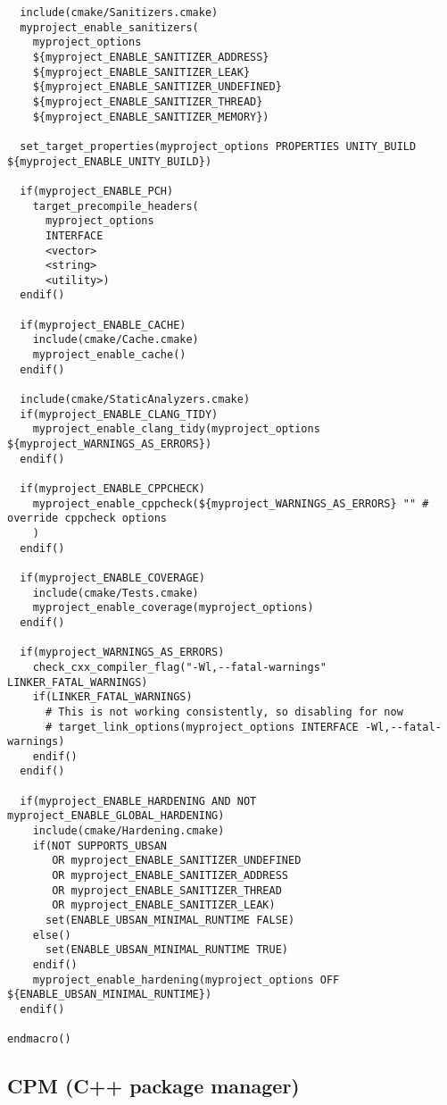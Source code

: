 \documentclass[openany]{report}
\begin{document}
\begin{verbatim}
  include(cmake/Sanitizers.cmake)
  myproject_enable_sanitizers(
    myproject_options
    ${myproject_ENABLE_SANITIZER_ADDRESS}
    ${myproject_ENABLE_SANITIZER_LEAK}
    ${myproject_ENABLE_SANITIZER_UNDEFINED}
    ${myproject_ENABLE_SANITIZER_THREAD}
    ${myproject_ENABLE_SANITIZER_MEMORY})

  set_target_properties(myproject_options PROPERTIES UNITY_BUILD ${myproject_ENABLE_UNITY_BUILD})

  if(myproject_ENABLE_PCH)
    target_precompile_headers(
      myproject_options
      INTERFACE
      <vector>
      <string>
      <utility>)
  endif()

  if(myproject_ENABLE_CACHE)
    include(cmake/Cache.cmake)
    myproject_enable_cache()
  endif()

  include(cmake/StaticAnalyzers.cmake)
  if(myproject_ENABLE_CLANG_TIDY)
    myproject_enable_clang_tidy(myproject_options ${myproject_WARNINGS_AS_ERRORS})
  endif()

  if(myproject_ENABLE_CPPCHECK)
    myproject_enable_cppcheck(${myproject_WARNINGS_AS_ERRORS} "" # override cppcheck options
    )
  endif()

  if(myproject_ENABLE_COVERAGE)
    include(cmake/Tests.cmake)
    myproject_enable_coverage(myproject_options)
  endif()

  if(myproject_WARNINGS_AS_ERRORS)
    check_cxx_compiler_flag("-Wl,--fatal-warnings" LINKER_FATAL_WARNINGS)
    if(LINKER_FATAL_WARNINGS)
      # This is not working consistently, so disabling for now
      # target_link_options(myproject_options INTERFACE -Wl,--fatal-warnings)
    endif()
  endif()

  if(myproject_ENABLE_HARDENING AND NOT myproject_ENABLE_GLOBAL_HARDENING)
    include(cmake/Hardening.cmake)
    if(NOT SUPPORTS_UBSAN 
       OR myproject_ENABLE_SANITIZER_UNDEFINED
       OR myproject_ENABLE_SANITIZER_ADDRESS
       OR myproject_ENABLE_SANITIZER_THREAD
       OR myproject_ENABLE_SANITIZER_LEAK)
      set(ENABLE_UBSAN_MINIMAL_RUNTIME FALSE)
    else()
      set(ENABLE_UBSAN_MINIMAL_RUNTIME TRUE)
    endif()
    myproject_enable_hardening(myproject_options OFF ${ENABLE_UBSAN_MINIMAL_RUNTIME})
  endif()

endmacro()
\end{verbatim}

\subsection{CPM (C++ package manager)}
\end{document}
